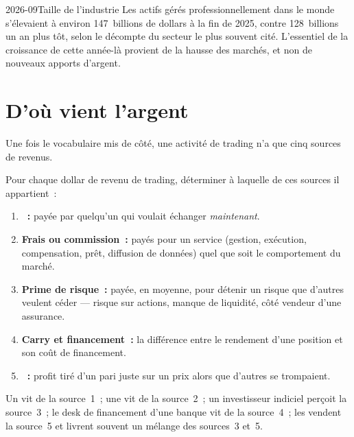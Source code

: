 \begin{dated}{2026-09}{Taille de l'industrie}\label{dat:m1:what-a-trading-firm-does:aum}
Les actifs gérés professionnellement dans le monde s'élevaient à environ 147~billions de dollars à la fin
de 2025, contre 128~billions un an plus tôt, selon le décompte du secteur le plus souvent cité.
L'essentiel de la croissance de cette année-là provient de la hausse des marchés, et non de nouveaux
apports d'argent.
\end{dated}

\section{D'où vient l'argent}

Une fois le vocabulaire mis de côté, une activité de trading n'a que cinq sources de
revenus.

\begin{method}\label{met:m1:what-a-trading-firm-does:sources}
Pour chaque dollar de revenu de trading, déterminer à laquelle de ces sources il appartient~:
\begin{enumerate}
\item \textbf{~:} payée par quelqu'un qui voulait échanger \emph{maintenant}.
\item \textbf{Frais ou commission~:} payés pour un service (gestion, exécution, compensation, prêt,
  diffusion de données) quel que soit le comportement du marché.
\item \textbf{Prime de risque~:} payée, en moyenne, pour détenir un risque que d'autres veulent céder
  --- risque sur actions, manque de liquidité, côté vendeur d'une assurance.
\item \textbf{Carry et financement~:} la différence entre le rendement d'une position
  et son coût de financement.
\item \textbf{~:} profit tiré d'un pari juste sur un prix alors que d'autres
  se trompaient.
\end{enumerate}
Un  vit de la source~1~; une  vit de la source~2~; un investisseur indiciel perçoit la source~3~;
le desk de financement d'une banque vit de la source~4~; les  vendent la source~5 et livrent souvent
un mélange des sources~3 et~5.
\end{method}

